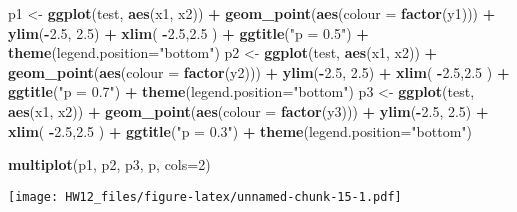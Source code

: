 \documentclass[]{article}
\newenvironment{Shaded}{\begin{snugshade}}{\end{snugshade}}
\newcommand{\KeywordTok}[1]{\textcolor[rgb]{0.13,0.29,0.53}{\textbf{#1}}}
\newcommand{\DataTypeTok}[1]{\textcolor[rgb]{0.13,0.29,0.53}{#1}}
\newcommand{\DecValTok}[1]{\textcolor[rgb]{0.00,0.00,0.81}{#1}}
\newcommand{\FloatTok}[1]{\textcolor[rgb]{0.00,0.00,0.81}{#1}}
\newcommand{\StringTok}[1]{\textcolor[rgb]{0.31,0.60,0.02}{#1}}
\newcommand{\OperatorTok}[1]{\textcolor[rgb]{0.81,0.36,0.00}{\textbf{#1}}}
\newcommand{\NormalTok}[1]{#1}
\begin{document}
\begin{Shaded}
\begin{Highlighting}[]
\NormalTok{p1 <-}\StringTok{ }\KeywordTok{ggplot}\NormalTok{(test, }\KeywordTok{aes}\NormalTok{(x1, x2)) }\OperatorTok{+}\StringTok{ }\KeywordTok{geom_point}\NormalTok{(}\KeywordTok{aes}\NormalTok{(}\DataTypeTok{colour =} \KeywordTok{factor}\NormalTok{(y1))) }\OperatorTok{+}
\StringTok{  }\KeywordTok{ylim}\NormalTok{(}\OperatorTok{-}\FloatTok{2.5}\NormalTok{, }\FloatTok{2.5}\NormalTok{) }\OperatorTok{+}\StringTok{ }\KeywordTok{xlim}\NormalTok{( }\OperatorTok{-}\FloatTok{2.5}\NormalTok{,}\FloatTok{2.5}\NormalTok{ ) }\OperatorTok{+}\StringTok{ }\KeywordTok{ggtitle}\NormalTok{(}\StringTok{"p = 0.5"}\NormalTok{) }\OperatorTok{+}
\StringTok{  }\KeywordTok{theme}\NormalTok{(}\DataTypeTok{legend.position=}\StringTok{"bottom"}\NormalTok{)}
\NormalTok{p2 <-}\StringTok{ }\KeywordTok{ggplot}\NormalTok{(test, }\KeywordTok{aes}\NormalTok{(x1, x2)) }\OperatorTok{+}\StringTok{ }\KeywordTok{geom_point}\NormalTok{(}\KeywordTok{aes}\NormalTok{(}\DataTypeTok{colour =} \KeywordTok{factor}\NormalTok{(y2))) }\OperatorTok{+}
\StringTok{  }\KeywordTok{ylim}\NormalTok{(}\OperatorTok{-}\FloatTok{2.5}\NormalTok{, }\FloatTok{2.5}\NormalTok{) }\OperatorTok{+}\StringTok{ }\KeywordTok{xlim}\NormalTok{( }\OperatorTok{-}\FloatTok{2.5}\NormalTok{,}\FloatTok{2.5}\NormalTok{ ) }\OperatorTok{+}\StringTok{ }\KeywordTok{ggtitle}\NormalTok{(}\StringTok{"p = 0.7"}\NormalTok{) }\OperatorTok{+}
\StringTok{  }\KeywordTok{theme}\NormalTok{(}\DataTypeTok{legend.position=}\StringTok{"bottom"}\NormalTok{)}
\NormalTok{p3 <-}\StringTok{ }\KeywordTok{ggplot}\NormalTok{(test, }\KeywordTok{aes}\NormalTok{(x1, x2)) }\OperatorTok{+}\StringTok{ }\KeywordTok{geom_point}\NormalTok{(}\KeywordTok{aes}\NormalTok{(}\DataTypeTok{colour =} \KeywordTok{factor}\NormalTok{(y3))) }\OperatorTok{+}
\StringTok{  }\KeywordTok{ylim}\NormalTok{(}\OperatorTok{-}\FloatTok{2.5}\NormalTok{, }\FloatTok{2.5}\NormalTok{) }\OperatorTok{+}\StringTok{ }\KeywordTok{xlim}\NormalTok{( }\OperatorTok{-}\FloatTok{2.5}\NormalTok{,}\FloatTok{2.5}\NormalTok{ ) }\OperatorTok{+}\StringTok{ }\KeywordTok{ggtitle}\NormalTok{(}\StringTok{"p = 0.3"}\NormalTok{) }\OperatorTok{+}
\StringTok{  }\KeywordTok{theme}\NormalTok{(}\DataTypeTok{legend.position=}\StringTok{"bottom"}\NormalTok{)}

\KeywordTok{multiplot}\NormalTok{(p1, p2, p3,  p, }\DataTypeTok{cols=}\DecValTok{2}\NormalTok{)}
\end{Highlighting}
\end{Shaded}

\texttt{[image: HW12\_files/figure-latex/unnamed-chunk-15-1.pdf]}
\end{document}
